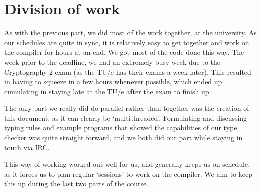 \documentclass[a4paper]{article}
\begin{document}
\section{Division of work}

As with the previous part, we did most of the work together, at the university. As our schedules are quite in sync, it is relatively easy to get together and work on the compiler for hours at an end. We got most of the code done this way. The week prior to the deadline, we had an extremely busy week due to the Cryptography 2 exam (as the TU/e has their exams a week later). This resulted in having to squeeze in a few hours whenever possible, which ended up cumulating in staying late at the TU/e after the exam to finish up.

The only part we really did do parallel rather than together was the creation of this document, as it can clearly be `multithreaded'. Formulating and discussing typing rules and example programs that showed the capabilities of our type checker was quite straight forward, and we both did our part while staying in touch via IRC.

This way of working worked out well for us, and generally keeps us on schedule, as it forces us to plan regular `sessions' to work on the compiler. We aim to keep this up during the last two parts of the course.
\end{document}
